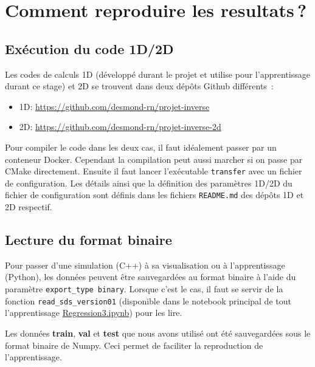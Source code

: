 

\chapter{Comment reproduire les resultats ?} %

\label{AppendixA} %

\section{Exécution du code 1D/2D}

Les codes de calculs 1D (développé durant le projet et utilise pour l'apprentissage durant ce stage) et 2D se trouvent dans deux dépôts Github différents :
\begin{itemize}
 \item 1D: \url{https://github.com/desmond-rn/projet-inverse} 
 \item 2D: \url{https://github.com/desmond-rn/projet-inverse-2d}
\end{itemize}

Pour compiler le code dans les deux cas, il faut idéalement passer par un conteneur Docker. Cependant la compilation peut aussi marcher si on passe par CMake directement.
Ensuite il faut lancer l'exécutable \verb|transfer| avec un fichier de configuration. Les détails ainsi que la définition des paramètres 1D/2D du fichier de configuration sont définis dans les fichiers \verb|README.md| des dépôts 1D et 2D respectif.

\section{Lecture du format binaire}
Pour passer d'une simulation (C++) à sa visualisation ou à l'apprentissage (Python), les données peuvent être sauvegardées au format binaire à l'aide du paramètre \verb|export_type binary|. Lorsque c'est le cas, il faut se servir de la fonction \verb|read_sds_version01| (disponible dans le notebook principal de tout l'apprentissage \href{https://colab.research.google.com/drive/18oCXoZzY0_7XnEmHBzHH40vVVnIacoVc?usp=sharing}{Regression3.ipynb}) pour les lire.

Les données \textbf{train}, \textbf{val} et \textbf{test} que nous avons utilisé ont été sauvegardées sous le format binaire de Numpy. Ceci permet de faciliter la reproduction de l'apprentissage.


